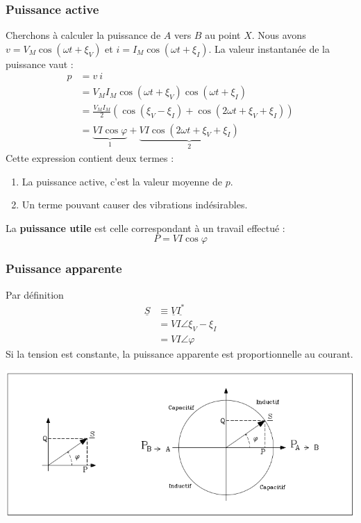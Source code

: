 		\subsubsection{Puissance active}
		Cherchons à calculer la puissance de $A$ vers $B$ au point $X$. Nous 
		avons $v = V_M\cos(\omega t +\xi_V)$ et $i = I_M\cos(\omega t + \xi_I)$. 
		La valeur instantanée de la puissance vaut :
		\begin{equation}
		\begin{array}{ll}
		p &= v\ i\\
	      &= V_MI_M\cos(\omega t +\xi_V)\cos(\omega t +\xi_I)\\
	      &= \frac{V_MI_M}{2}(\cos(\xi_V-\xi_I) + \cos(2\omega t +\xi_V+\xi_I))\\
	      &= \underbrace{VI \cos\varphi}_{1} + \underbrace{VI \cos(2\omega t +
	      \xi_V+\xi_I)}_{2}
		\end{array}
		\end{equation}
		Cette expression contient deux termes :
		\begin{enumerate}
		\item La puissance active, c'est la valeur moyenne de $p$.
		\item Un terme pouvant causer des vibrations indésirables.
		\end{enumerate}
		La \textbf{puissance utile} est celle correspondant à un travail 
		effectué :
		\begin{equation}
		P = VI \cos\varphi
		\end{equation}
		
		\subsubsection{Puissance apparente}
		Par définition
		\begin{equation}
		\begin{array}{ll}
		\underline{S} &\equiv \underline{V}\underline{I^*}\\
		 &= VI \angle \xi_V-\xi_I\\
		 &= VI\angle\varphi
		\end{array}
		\end{equation}
		Si la tension est constante, la puissance apparente est proportionnelle 
		au courant.
		\begin{center}
		\includegraphics[scale=0.4]{ch1/image4.png}
		\end{center}	
		
